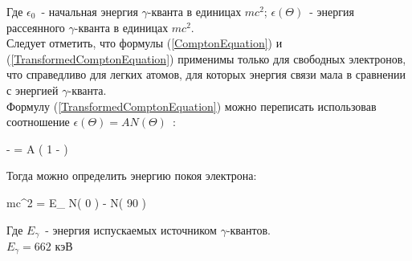 Где $ \epsilon_0 \, $ - начальная энергия $ \gamma $-кванта в единицах $ mc^2 $;
$ \epsilon{\left( \Theta \right)} \, $ - энергия рассеянного $ \gamma $-кванта в единицах
$ mc^2 $. \\

Следует отметить, что формулы (\ref{ComptonEquation}) и (\ref{TransformedComptonEquation})
применимы только для свободных электронов, что справедливо для легких атомов, для которых
энергия связи мала в сравнении с энергией $ \gamma $-кванта. \\

Формулу (\ref{TransformedComptonEquation}) можно переписать использовав соотношение
$ \epsilon{\left( \Theta \right)} = AN{\left( \Theta \right)} \, $ :

{
     -  =
        A \left( 1 - \cos{\Theta} \right)
}

Тогда можно определить энергию покоя электрона:

{ mc^2 = E_\gamma {} {N{\left( 0 \right)} - N{\left( 90 \right)}} }

Где $ E_\gamma \, $ - энергия испускаемых источником $ \gamma $-квантов. \\
$ E_\gamma = 662 $ кэВ